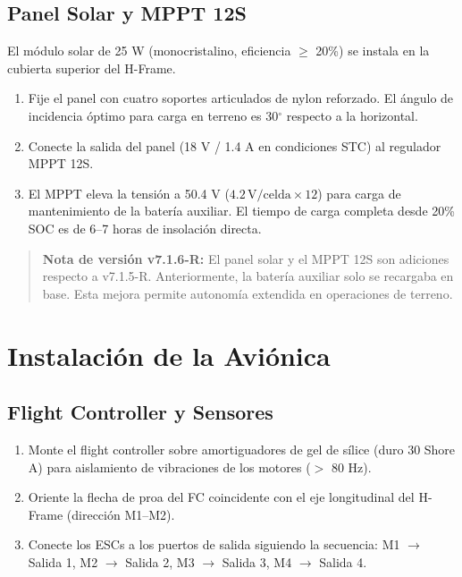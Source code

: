 \subsection{Panel Solar y MPPT 12S}

El módulo solar de 25 W (monocristalino, eficiencia $\geq$ 20\%) se instala en la cubierta superior del H-Frame.

\begin{enumerate}
    \item Fije el panel con cuatro soportes articulados de nylon reforzado. El ángulo de incidencia óptimo para carga en terreno es 30$^\circ$ respecto a la horizontal.
    \item Conecte la salida del panel (18 V / 1.4 A en condiciones STC) al regulador MPPT 12S.
    \item El MPPT eleva la tensión a 50.4 V ($4.2\,\text{V/celda} \times 12$) para carga de mantenimiento de la batería auxiliar. El tiempo de carga completa desde 20\% SOC es de 6--7 horas de insolación directa.
\end{enumerate}

\begin{quote}
\textbf{Nota de versión v7.1.6-R:} El panel solar y el MPPT 12S son adiciones respecto a v7.1.5-R. Anteriormente, la batería auxiliar solo se recargaba en base. Esta mejora permite autonomía extendida en operaciones de terreno.
\end{quote}

\section{Instalación de la Aviónica}

\subsection{Flight Controller y Sensores}

\begin{enumerate}
    \item Monte el flight controller sobre amortiguadores de gel de sílice (duro 30 Shore A) para aislamiento de vibraciones de los motores ($>$ 80 Hz).
    \item Oriente la flecha de proa del FC coincidente con el eje longitudinal del H-Frame (dirección M1--M2).
    \item Conecte los ESCs a los puertos de salida siguiendo la secuencia: M1 $\rightarrow$ Salida 1, M2 $\rightarrow$ Salida 2, M3 $\rightarrow$ Salida 3, M4 $\rightarrow$ Salida 4.
\end{enumerate}

